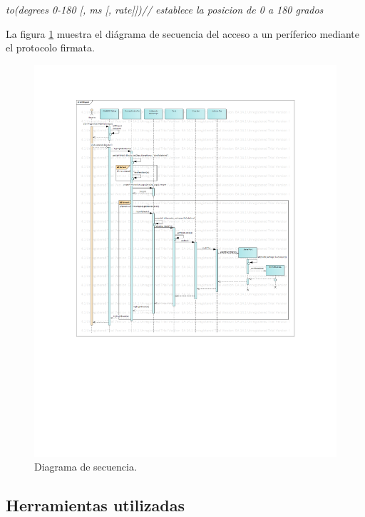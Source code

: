 \emph{to(degrees 0-180 [, ms [, rate]])// establece la posicion de 0 a 180 grados}


La figura \ref{fig:DocSecuencia} muestra el diágrama de secuencia del acceso a un períferico mediante el protocolo firmata.


\begin{figure}[!htbp]
	\begin{center}  %
		\includegraphics*[width=15cm]{./Figures/DocSecuencia.pdf}
		\par\caption{Diagrama de secuencia.}\label{fig:DocSecuencia}
	\end{center}
\end{figure}


\subsection{Herramientas utilizadas}
\label{subsec:Implementación del modelo computacional Servicios}

